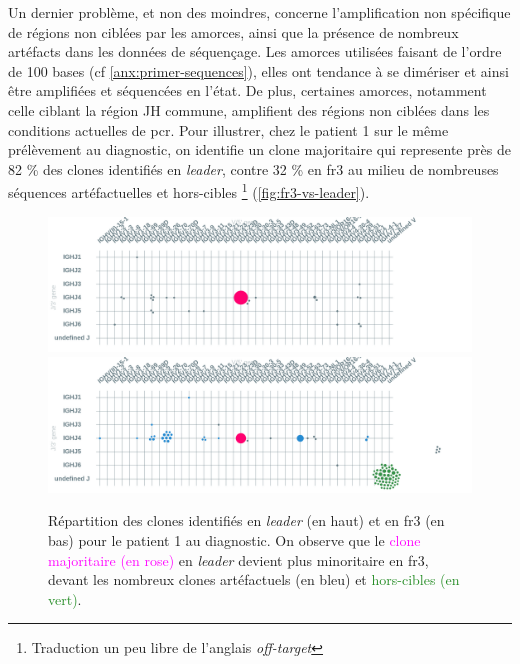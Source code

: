 Un dernier problème, et non des moindres, concerne l'amplification non spécifique de régions non ciblées par les amorces, 
ainsi que la présence de nombreux artéfacts dans les données de séquençage. Les amorces utilisées faisant de l'ordre de 100 bases 
(cf \autoref{anx:primer-sequences}), elles ont tendance à se dimériser et ainsi être amplifiées et séquencées en l'état. 
De plus, certaines amorces, notamment celle ciblant la région JH commune, amplifient des régions non ciblées dans 
les conditions actuelles de \gls{pcr}. Pour illustrer, chez le patient 1 sur le même prélèvement au diagnostic, on identifie 
un clone majoritaire qui represente près de 82 \% des clones identifiés en \textit{leader}, contre 32 \% en \gls{fr}3 au milieu 
de nombreuses séquences artéfactuelles et hors-cibles \footnote{Traduction un peu libre de l'anglais \textit{off-target}} (\autoref{fig:fr3-vs-leader}).

\begin{figure}[H]
    \centering
    \includegraphics[width=1\textwidth]{images/diag_leader.png}
    \vspace{0.5cm}
    \includegraphics[width=1\textwidth]{images/diag_fr3.png}
    \caption{
        Répartition des clones identifiés en \textit{leader} (en haut) et en \gls{fr}3 (en bas) 
        pour le patient 1 au diagnostic. On observe que le \textcolor{Magenta}{clone majoritaire (en rose)} 
        en \textit{leader} devient plus minoritaire en \gls{fr}3, devant les \textcolor{ProcessBlue}{nombreux clones artéfactuels (en bleu)}  
        et \textcolor{ForestGreen}{hors-cibles (en vert)}.
    }
    \label{fig:fr3-vs-leader}
\end{figure}

